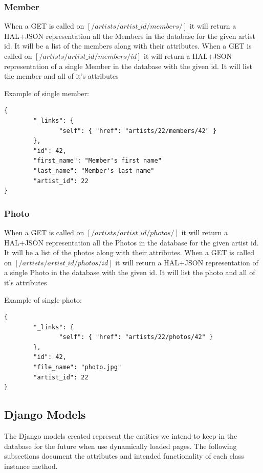 \documentclass[12pt,english]{scrartcl}
\begin{document}
\subsubsection{Member}
When a GET is called on $[/artists/{artist\_id}/members/]$ it will return a HAL+JSON representation all the Members in the database for the given artist id.  It will be a list of the members along with their attributes.
When a GET is called on $[/artists/{artist\_id}/members/{id}]$ it will return a HAL+JSON representation of a single Member in the database with the given id.  It will list the member and all of it's attributes

Example of single member:
\begin{verbatim}
{
        "_links": {
               "self": { "href": "artists/22/members/42" }
        },
        "id": 42,
        "first_name": "Member's first name"
        "last_name": "Member's last name"
        "artist_id": 22
}
\end{verbatim}
\subsubsection{Photo}
When a GET is called on $[/artists/{artist\_id}/photos/]$ it will return a HAL+JSON representation all the Photos in the database for the given artist id.  It will be a list of the photos along with their attributes.
When a GET is called on $[/artists/{artist\_id}/photos/{id}]$ it will return a HAL+JSON representation of a single Photo in the database with the given id.  It will list the photo and all of it's attributes

Example of single photo:
\begin{verbatim}
{
        "_links": {
               "self": { "href": "artists/22/photos/42" }
        },
        "id": 42,
        "file_name": "photo.jpg"
        "artist_id": 22
}
\end{verbatim}

\subsection{Django Models}
The Django models created represent the entities we intend to keep in the database for the future when use dynamically loaded pages.
The following subsections document the attributes and intended functionality of each class instance method. 
\end{document}
